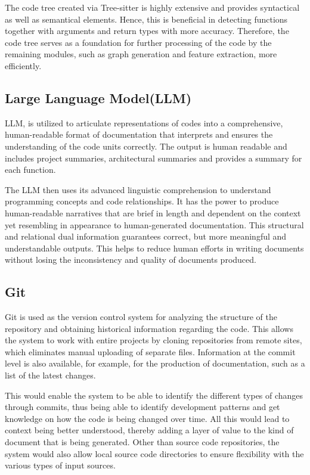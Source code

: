 \par The code tree created via Tree-sitter is highly extensive and provides syntactical as well as semantical elements. Hence, this is beneficial in detecting functions together with arguments and return types with more accuracy. Therefore, the code tree serves as a foundation for further processing of the code by the remaining modules, such as graph generation and feature extraction, more efficiently. 

\subsection{Large Language Model(LLM)}
\hspace{0.5cm}LLM, is utilized to articulate representations of codes into a comprehensive, human-readable format of documentation that interprets and ensures the understanding of the code units correctly. The output is human readable and includes project summaries, architectural summaries and provides a summary for each function. 

\par The LLM then uses its advanced linguistic comprehension to understand programming concepts and code relationships. It has the power to produce human-readable narratives that are brief in length and dependent on the context yet resembling in appearance to human-generated documentation. This structural and relational dual information guarantees correct, but more meaningful and understandable outputs. This helps to reduce human efforts in writing documents without losing the inconsistency and quality of documents produced. 


\subsection{Git}
\hspace{0.5cm}
Git is used as the version control system for analyzing the structure of the repository and obtaining historical information regarding the code. This allows the system to work with entire projects by cloning repositories from remote sites, which eliminates manual uploading of separate files. Information at the commit level is also available, for example, for the production of documentation, such as a list of the latest changes. 

\par This would enable the system to be able to identify the different types of changes through commits, thus being able to identify development patterns and get knowledge on how the code is being changed over time. All this would lead to context being better understood, thereby adding a layer of value to the kind of document that is being generated. Other than source code repositories, the system would also allow local source code directories to ensure flexibility with the various types of input sources. 

